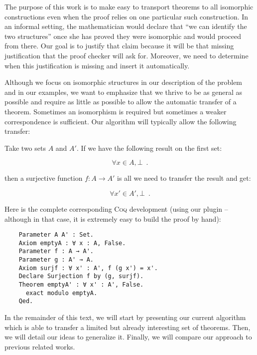 \documentclass{llncs}
\begin{document}
The purpose of this work is to make easy to transport theorems
to all isomorphic constructions even when the proof relies on one
particular such construction. In an informal setting,
the mathematician would declare that ``we can identify the two structures''
once she has proved they were isomorphic and would proceed from there.
Our goal is to justify that claim because it will be that missing
justification that the proof checker will ask for.
Moreover, we need to determine when this justification is missing and
insert it automatically.

Although we focus on isomorphic structures in our description of the
problem and in our examples, we want to emphasize that we thrive to be
as general as possible and require as little as possible to allow
the automatic transfer of a theorem. Sometimes an isomorphism is required
but sometimes a weaker correspondence is sufficient.
Our algorithm will typically allow the following
transfer:

\begin{example}
    Take two sets $A$ and $A'$.
    If we have the following result on the first set:
    \begin{axiom}[A is empty]
        \[\forall x \in A, \bot \enspace .\]
    \end{axiom}
    then a surjective function $f : A \rightarrow A'$ is all we need to
    transfer the result and get:
    \begin{theorem}[A' is empty]
        \[\forall x' \in A', \bot \enspace .\]
    \end{theorem}

    Here is the complete corresponding \textsc{Coq} development
    (using our plugin -- although in that case, it is extremely easy to
    build the proof by hand):
    \begin{verbatim}
    Parameter A A' : Set.
    Axiom emptyA : ∀ x : A, False.
    Parameter f : A → A'.
    Parameter g : A' → A.
    Axiom surjf : ∀ x' : A', f (g x') = x'.
    Declare Surjection f by (g, surjf).
    Theorem emptyA' : ∀ x' : A', False.
      exact modulo emptyA.
    Qed.\end{verbatim}
\end{example}

In the remainder of this text, we will start by presenting our current
algorithm which is able to transfer a limited but already interesting
set of theorems. Then, we will detail our ideas to generalize it.
Finally, we will compare our approach to previous related works.
\end{document}
